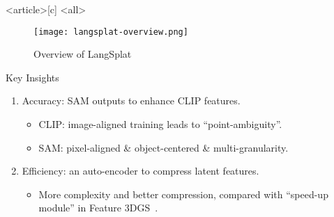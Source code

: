 
\begin{frame}<article>[c]
	\mode<all>{}%
	\begin{figure}[htbp]
		\centering
		\begin{annotatedFigureEnv}
			{\texttt{[image: langsplat-overview.png]}}
		\end{annotatedFigureEnv}
		\vspace*{0.5ex}
        \caption{Overview of LangSplat}\label{fig:langsplat-overview}
	\end{figure}
	\begin{block}{Key Insights}
		\begin{enumerate}
			\item \alert{Accuracy:} SAM outputs to enhance CLIP features.
			      \begin{itemize}
				      \item \alert{CLIP:} image-aligned training leads to ``point-ambiguity''.
				      \item \alert{SAM:} pixel-aligned \& object-centered \& multi-granularity.
			      \end{itemize}
			\item \alert{Efficiency:} an \alert{auto-encoder} to compress latent features.
			      \begin{itemize}
				      \item More complexity and better compression, compared with ``speed-up module'' in Feature 3DGS~\autocite{zhouFeature3DGSSupercharging2024apr}.
			      \end{itemize}
		\end{enumerate}
	\end{block}
\end{frame}


